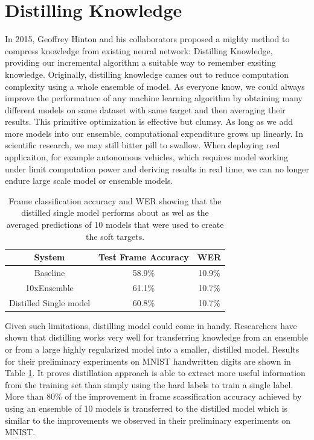 \documentclass[12pt]{report}
\begin{document}
\section{Distilling Knowledge}
\par In 2015, Geoffrey Hinton and his collaborators proposed a mighty method to compress knowledge from existing neural network: Distilling Knowledge\cite{hinton}, providing our incremental algorithm a suitable way to remember exsiting knowledge. Originally, distilling knowledge cames out to reduce computation complexity using a whole ensemble of model. As everyone know, we could always improve the performatnce of any machine learning algorithm by obtaining many different models on same dataset with same target and then averaging their results. This primitive optimization is effective but clumsy. As long as we add more models into our ensemble, computational expenditure grows up linearly. In scientific research, we may still bitter pill to swallow. When deploying real applicaiton, for example autonomous vehicles, which requires model working under limit computation power and deriving results in real time, we can no longer endure large scale model or ensemble models.
\begin{table}
	\centering
	\begin{tabular}{|c|c|c|}
		\toprule
		System & Test Frame Accuracy & WER \\
		\midrule
		Baseline & 58.9\% & 10.9\% \\
		10xEnsemble & 61.1\% & 10.7\%\\
		Distilled Single model & 60.8\% & 10.7\% \\
		\bottomrule
	\end{tabular}
	\caption{Frame classification accuracy and WER showing that the distilled single model performs about as wel as the averaged predictions of 10 models that were used to create the soft targets.}
	\label{tab1}
\end{table}
\par Given such limitations, distilling model could come in handy. Researchers have shown that distilling works very well for transferring knowledge from an ensemble or from a large highly regularized model into a smaller, distilled model. Results for their preliminary experiments on MNIST handwritten digits are shown in Table \ref{tab1}. It proves distillation approach is able to extract more useful information from the training set than simply using the hard labels to train a single label. More than 80\% of the improvement in frame scassification accuracy achieved by using an ensemble of 10 models is transferred to the distilled model which is similar to the improvements we observed in their preliminary experiments on MNIST.
\end{document}
